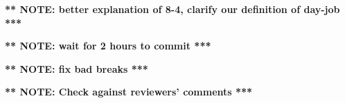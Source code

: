 \documentclass{sig-alternate}
\newcommand{\note}[1]{{\bf *** NOTE: {#1} ***}}
\begin{document}












\note{better explanation of 8-4, clarify our definition of day-job}

\note{wait for 2 hours to commit}

\note{fix bad breaks}

\note{Check against reviewers' comments}

\end{document}

